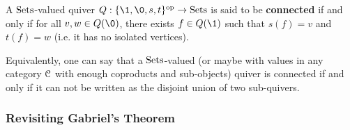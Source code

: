             \begin{definition} \label{def: connected_quivers}
                A $\mathrm{Sets}$-valued quiver $Q: \{\1, \0, s, t\}^{\op} \to \Sets$ is said to be \textbf{connected} if and only if for all $v, w \in Q(\0)$, there exists $f \in Q(\1)$ such that $s(f) = v$ and $t(f) = w$ (i.e. it has no isolated vertices).
            \end{definition}
            \begin{remark}
                Equivalently, one can say that a $\mathrm{Sets}$-valued (or maybe with values in any category $\mathcal{C}$ with enough coproducts and sub-objects) quiver is connected if and only if it can not be written as the disjoint union of two sub-quivers. 
            \end{remark}
            
        \subsubsection{Revisiting Gabriel's Theorem}